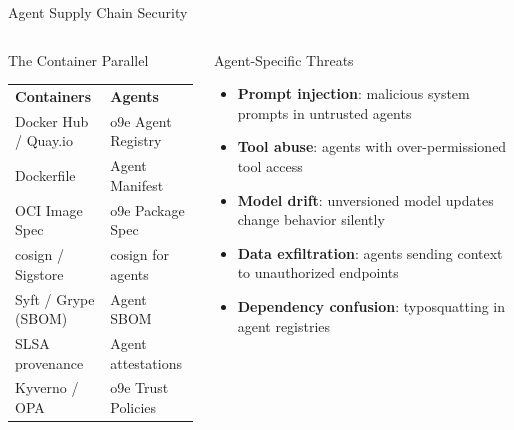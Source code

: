 \begin{frame}{\fontsize{10}{12}\selectfont Agent Supply Chain Security}
  \vspace{0.1cm}

  \fontsize{6}{7}\selectfont
  \begin{columns}[T]
    \begin{block}{\fontsize{6}{7}\selectfont The Container Parallel}
      \fontsize{5.5}{6.5}\selectfont
      \begin{tabular}{ll}
        \textbf{Containers} & \textbf{Agents} \\
        Docker Hub / Quay.io & o9e Agent Registry \\
        Dockerfile & Agent Manifest \\
        OCI Image Spec & o9e Package Spec \\
        cosign / Sigstore & cosign for agents \\
        Syft / Grype (SBOM) & Agent SBOM \\
        SLSA provenance & Agent attestations \\
        Kyverno / OPA & o9e Trust Policies \\
      \end{tabular}
    \end{block}

    \begin{alertblock}{\fontsize{6}{7}\selectfont Agent-Specific Threats}
      \fontsize{5.5}{6.5}\selectfont
      \begin{itemize}
        \setlength{\itemsep}{0pt}
        \item \textbf{Prompt injection}: malicious system prompts in untrusted agents
        \item \textbf{Tool abuse}: agents with over-permissioned tool access
        \item \textbf{Model drift}: unversioned model updates change behavior silently
        \item \textbf{Data exfiltration}: agents sending context to unauthorized endpoints
        \item \textbf{Dependency confusion}: typosquatting in agent registries
      \end{itemize}
    \end{alertblock}
  \end{columns}
\end{frame}
